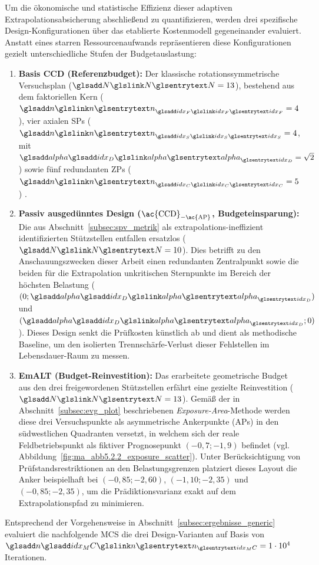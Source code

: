 Um die ökonomische und statistische Effizienz dieser adaptiven Extrapolationsabsicherung abschließend zu quantifizieren, werden drei spezifische Design-Konfigurationen über das etablierte Kostenmodell gegeneinander evaluiert.
Anstatt eines starren Ressourcenaufwands repräsentieren diese Konfigurationen gezielt unterschiedliche Stufen der Budgetauslastung:
\begin{enumerate}
    \item \textbf{Basis \ac{CCD} (Referenzbudget):} Der klassische rotationssymmetrische Versuchsplan ($\sym{N} = 13$), bestehend aus dem faktoriellen Kern ($\sym{n}_{\sym{idx_F}}=4$), vier axialen \acp{SP} ($\sym{n}_{\sym{idx_S}}=4$, mit $\symsub{alpha}{idx_D}=\sqrt{2}$) sowie fünf redundanten \acp{ZP} ($\sym{n}_{\sym{idx_C}}=5$) \cite{Montgomery.2020}.
    \item \textbf{Passiv ausgedünntes Design ($\textnormal{\ac{CCD}}_{-\textnormal{\ac{AP}}}$, Budgeteinsparung):} Die aus Abschnitt~\ref{subsec:spv_metrik} als extrapolations-ineffizient identifizierten Stützstellen entfallen ersatzlos ($\sym{N} = 10$).
          Dies betrifft zu den Anschauungszwecken dieser Arbeit einen redundanten Zentralpunkt sowie die beiden für die Extrapolation unkritischen Sternpunkte im Bereich der höchsten Belastung ($(0; \symsub{alpha}{idx_D})$ und $(\symsub{alpha}{idx_D};0)$).
          Dieses Design senkt die Prüfkosten künstlich ab und dient als methodische Baseline, um den isolierten Trennschärfe-Verlust dieser Fehlstellen im Lebensdauer-Raum zu messen.
    \item \textbf{\ac{EmALT} (Budget-Reinvestition):} Das erarbeitete geometrische Budget aus den drei freigewordenen Stützstellen erfährt eine gezielte Reinvestition ($\sym{N} = 13$).
          Gemäß der in Abschnitt~\ref{subsec:evg_plot} beschriebenen \textit{Exposure-Area}-Methode werden diese drei Versuchspunkte als asymmetrische Ankerpunkte (\acp{AP}) in den südwestlichen Quadranten versetzt, in welchem sich der reale Feldbetriebspunkt als fiktiver Prognosepunkt $(-0{,}7 ; -1{,}9)$ befindet (vgl. Abbildung~\ref{fig:ma_abb5.2.2_exposure_scatter}).
          Unter Berücksichtigung von Prüfstandsrestriktionen an den Belastungsgrenzen platziert dieses Layout die Anker beispielhaft bei $(-0{,}85 ; -2{,}60)$, $(-1{,}10 ; -2{,}35)$ und $(-0{,}85 ; -2{,}35)$, um die Prädiktionsvarianz exakt auf dem Extrapolationspfad zu minimieren.
\end{enumerate}

Entsprechend der Vorgehensweise in Abschnitt~\ref{subsec:ergebnisse_generic} evaluiert die nachfolgende \ac{MCS} die drei Design-Varianten auf Basis von $\symsub{n}{idx_MC} = 1\cdot 10^4$ Iterationen.

